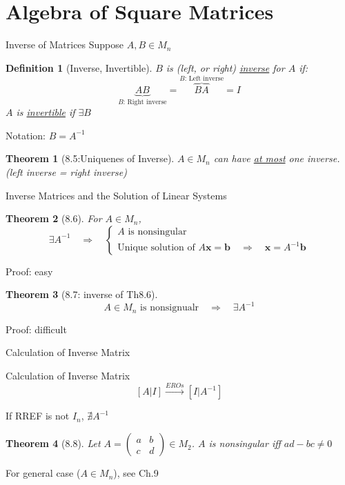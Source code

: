 \documentclass[a4paper,11pt]{article}
\newtheorem{defn}{Definition}
\newtheorem{thm}{Theorem}
\begin{document}
\section{Algebra of Square Matrices} %
\label{sec:algebra_of_square_matrices}
\begin{frame}[t]{Inverse of Matrices}
	Suppose $A,B\in M_n$
	\begin{defn}
		[Inverse, Invertible]
		$B$ is (left, or right) \uline{inverse} for $A$ if:\[
			\underbrace{AB}_{\text{$B$: Right inverse}}=\overbrace{BA}^{\text{$B$: Left inverse}}=I
		\]
		$A$ is \uline{invertible} if $\exists B$
	\end{defn}
	Notation: $B=A^{-1}$
	\begin{thm}
		[8.5:Uniquenes of Inverse]
		$A\in M_n$ can have \uline{at most} one inverse. (left inverse = right inverse)
	\end{thm}
\end{frame}

\begin{frame}[t]{Inverse Matrices and the Solution of Linear Systems}
	\begin{thm}
		[8.6] For $A\in M_n$,
		\[
			\exists A^{-1} \quad\Rightarrow\quad \begin{cases}
				A \text{ is nonsingular}\\
				\text{Unique solution of } A\mathbf{x}=\mathbf{b} \quad\Rightarrow\quad \mathbf{x}=A^{-1}\mathbf{b}
			\end{cases}
		\]
	\end{thm}
	Proof: easy
	\begin{thm}
		[8.7: inverse of Th8.6] \[
			A\in M_n \text{ is nonsignualr} \quad\Rightarrow\quad \exists A^{-1}
		\]
	\end{thm}
	Proof: difficult
\end{frame}

\begin{frame}[t]{Calculation of Inverse Matrix}
	\begin{block}
		{Calculation of Inverse Matrix}
		\[
			[A\vert I] \xrightarrow{EROs} [I\vert A^{-1}]
		\]
	\end{block}
	If RREF is not $I_n$, $\nexists A^{-1}$
	\begin{thm}
		[8.8] Let $A=\begin{pmatrix}
			a&b\\c&d
		\end{pmatrix} \in M_2$. $A$ is nonsingular iff $ad-bc\neq 0$
	\end{thm}
	For general case ($A\in M_n$), see Ch.9
\end{frame}
\end{document}
